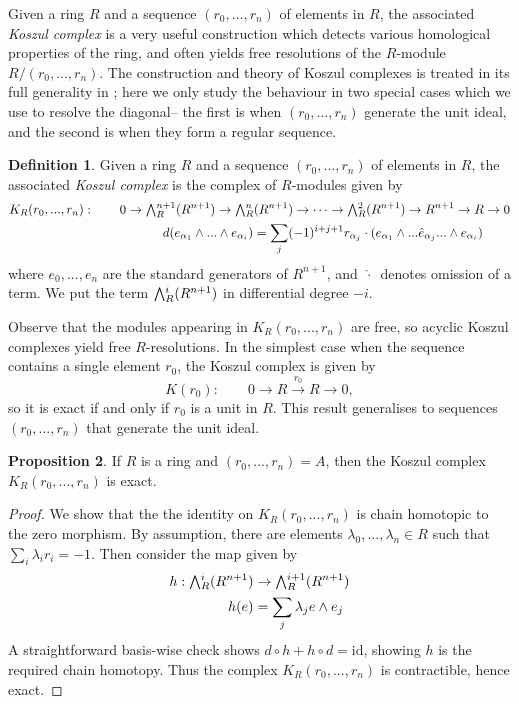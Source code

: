 \documentclass[a4paper]{article}
\theoremstyle{definition}
\newtheorem{defn}{Definition}[section]
\newtheorem{prop}[defn]{Proposition}
\theoremstyle{remark}
\newcommand{\Exter}{\mathchoice{{\textstyle\bigwedge}}%
    {{\bigwedge}}%
    {{\textstyle\wedge}}%
    {{\scriptstyle\wedge}}}
\begin{document}
Given a ring \(R\) and a sequence \((r_0,...,r_n)\) of elements in \(R\), the
associated \textit{Koszul complex} is a very useful construction which detects
various homological properties of the ring, and often yields free resolutions of
the \(R\)-module \(R/(r_0,...,r_n)\). The construction and theory of Koszul
complexes is treated in its full generality in
; here we only study the behaviour in two
special cases which we use to resolve the diagonal-- the first is
when \((r_0,...,r_n)\) generate the unit ideal, and the second is when they form
a regular sequence.  
\begin{defn}\label{koszulcomplexdefn}
Given a ring \(R\) and a sequence \((r_0,...,r_n)\) of elements in \(R\), the
associated \textit{Koszul complex} is the complex of \(R\)-modules given by
\begin{gather*}
    K_R(r_0,...,r_n) : \qquad 0\rightarrow \Exter_R^{n+1}(R^{n+1}) \rightarrow
    \Exter_R^n(R^{n+1}) \rightarrow
    \cdots \rightarrow \Exter_R^2(R^{n+1})\rightarrow R^{n+1} \rightarrow
    R \rightarrow 0  \\ 
    \qquad \qquad \qquad \qquad \qquad 
    d(e_{\alpha_1}\wedge...\wedge e_{\alpha_i}) = \sum_j
    (-1)^{i+j+1}r_{\alpha_j}\cdot (e_{\alpha_1} \wedge ...\hat{e}_{\alpha_j}...
    \wedge e_{\alpha_i})
\end{gather*}
where \(e_0,...,e_n\) are the standard generators of \(R^{n+1}\), and
\(\,\hat{\cdot}\,\) denotes omission of a term. We put the term
\(\Exter^i_R(R^{n+1})\) in differential degree \(-i\).
\end{defn}

Observe that the modules appearing in \(K_R(r_0,...,r_n)\) are free, so
acyclic Koszul complexes yield free \(R\)-resolutions. In the simplest case when
the sequence contains a single element \(r_0\), the Koszul complex is given by 
\[K(r_0):\qquad 0\rightarrow R \xrightarrow{\;r_0\; }R\rightarrow 0,\]
so it is exact if and only if \(r_0\) is a unit in \(R\). This result
generalises to sequences \((r_0,...,r_n)\) that generate the unit ideal.

\begin{prop}\label{koszul-unitideal}
    If \(R\) is a ring and \((r_0,...,r_n)=A\), then the
    Koszul complex \(K_R(r_0,...,r_n)\) is exact.
    \begin{proof}
        We show that the the identity on \(K_R(r_0,...,r_n)\) is chain
        homotopic to the zero morphism. By assumption, there are elements
        \(\lambda_0,...,\lambda_n\in R\) such that \(\sum_i \lambda_i r_i =-1\).
        Then consider the map given by
        \begin{align*}
            h: \Exter^i_R(R^{n+1})&\rightarrow \Exter^{i+1}_R(R^{n+1})\\
            h(e)&= \sum_j \lambda_j e\wedge e_j
        \end{align*}
        A straightforward basis-wise check shows \(d\circ h + h\circ d =
        \text{id}\), showing \(h\) is the required chain homotopy. Thus the
        complex \(K_R(r_0,...,r_n)\) is contractible, hence exact.
    \end{proof}
\end{prop}
\end{document}
